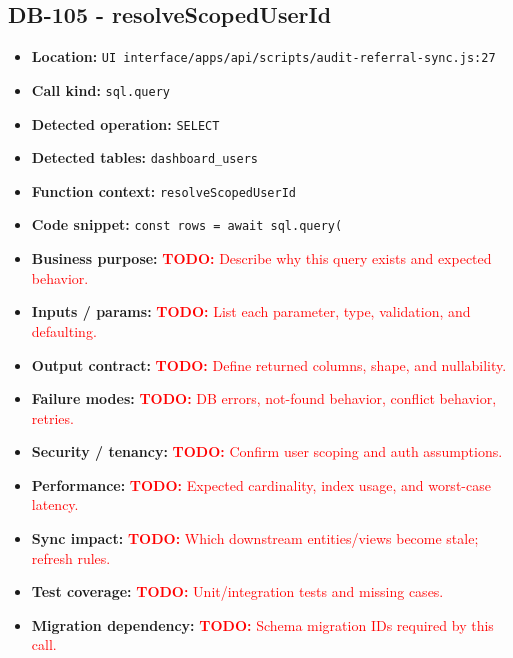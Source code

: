 \documentclass[11pt]{article}
\newcommand{\todoitem}[1]{\textcolor{red}{\textbf{TODO:} #1}}
\begin{document}
\subsection{DB-105 - resolveScopedUserId}
\begin{itemize}[leftmargin=1.5em]
\item \textbf{Location:} \texttt{UI interface/apps/api/scripts/audit-referral-sync.js:27}
\item \textbf{Call kind:} \texttt{sql.query}
\item \textbf{Detected operation:} \texttt{SELECT}
\item \textbf{Detected tables:} \texttt{dashboard\_users}
\item \textbf{Function context:} \texttt{resolveScopedUserId}
\item \textbf{Code snippet:} \texttt{const rows = await sql.query(}
\item \textbf{Business purpose:} \todoitem{Describe why this query exists and expected behavior.}
\item \textbf{Inputs / params:} \todoitem{List each parameter, type, validation, and defaulting.}
\item \textbf{Output contract:} \todoitem{Define returned columns, shape, and nullability.}
\item \textbf{Failure modes:} \todoitem{DB errors, not-found behavior, conflict behavior, retries.}
\item \textbf{Security / tenancy:} \todoitem{Confirm user scoping and auth assumptions.}
\item \textbf{Performance:} \todoitem{Expected cardinality, index usage, and worst-case latency.}
\item \textbf{Sync impact:} \todoitem{Which downstream entities/views become stale; refresh rules.}
\item \textbf{Test coverage:} \todoitem{Unit/integration tests and missing cases.}
\item \textbf{Migration dependency:} \todoitem{Schema migration IDs required by this call.}
\end{itemize}
\end{document}
